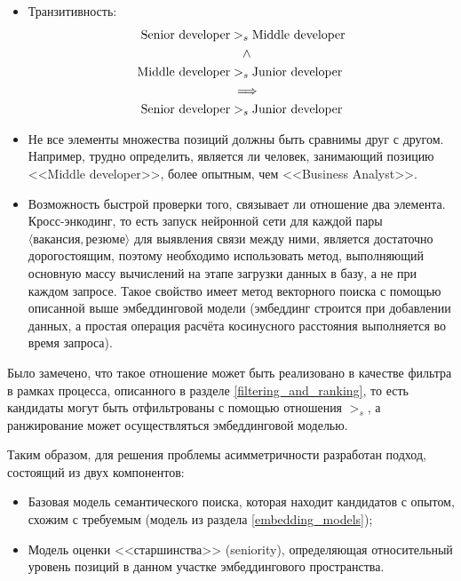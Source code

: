 \documentclass[14pt]{mmcs_article}
\begin{document}
\begin{itemize}
  \item Транзитивность: \\
        \begin{equation*}
          \centering
          \allowdisplaybreaks[1]
          \begin{split}
            \text{Senior developer} & >_{s} \text{Middle developer} \\
                                    & ~~~\land                      \\
            \text{Middle developer} & >_{s} \text{Junior developer} \\
                                    & \implies                      \\
            \text{Senior developer} & >_{s} \text{Junior developer}
          \end{split}
        \end{equation*}
  \item Не все элементы множества позиций должны быть сравнимы друг с другом. Например, трудно определить, является ли человек, занимающий позицию <<Middle developer>>, более опытным, чем <<Business Analyst>>.
  \item Возможность быстрой проверки того, связывает ли отношение два элемента. Кросс-энкодинг, то есть запуск нейронной сети для каждой пары $\langle \text{вакансия}, \text{резюме} \rangle$ для выявления связи между ними, является достаточно дорогостоящим, поэтому необходимо использовать метод, выполняющий основную массу вычислений на этапе загрузки данных в базу, а не при каждом запросе. Такое свойство имеет метод векторного поиска с помощью описанной выше эмбеддинговой модели (эмбеддинг строится при добавлении данных, а простая операция расчёта косинусного расстояния выполняется во время запроса).
\end{itemize}

Было замечено, что такое отношение может быть реализовано в качестве фильтра в рамках процесса, описанного в разделе \ref{filtering_and_ranking}, то есть кандидаты могут быть отфильтрованы с помощью отношения $>_{s}$, а ранжирование может осуществляться эмбеддинговой моделью.

Таким образом, для решения проблемы асимметричности разработан подход, состоящий из двух компонентов:

\begin{itemize}
  \item Базовая модель семантического поиска, которая находит кандидатов с опытом, схожим с требуемым (модель из раздела \ref{embedding_models});
  \item Модель оценки <<старшинства>> (seniority), определяющая относительный уровень позиций в данном участке эмбеддингового пространства.
\end{itemize}
\end{document}
